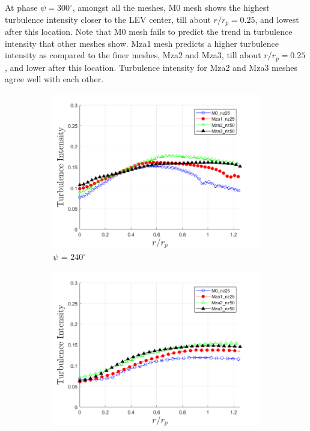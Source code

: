 At phase $\psi = 300^\circ$, amongst all the meshes, M0 mesh shows the highest turbulence intensity closer to the LEV center, till about $r/r_p = 0.25$, and lowest after this location.
Note that M0 mesh fails to predict the trend in turbulence intensity that other meshes show.
Mza1 mesh predicts a higher turbulence intensity as compared to the finer meshes, Mza2 and Mza3, till about $r/r_p = 0.25$, and lower after this location.
Turbulence intensity for Mza2 and Mza3 meshes agree well with each other. 


\begin{figure}[H]
	\centering
	\begin{subfigure}[b]{0.475\textwidth}
		\centering
		\includegraphics[width=1\textwidth]{figures/zonal_adapt_results/LEV/u_theta/TI_phase_240.png}
		\caption{$\psi$ = $240^\circ$}
		\label{fig:zonal_TI_240}
	\end{subfigure}
	\begin{subfigure}[b]{0.475\textwidth}
		\centering
		\includegraphics[width=1\textwidth]{figures/zonal_adapt_results/LEV/u_theta/TI_phase_270.png}

\end{subfigure}
\end{figure}
